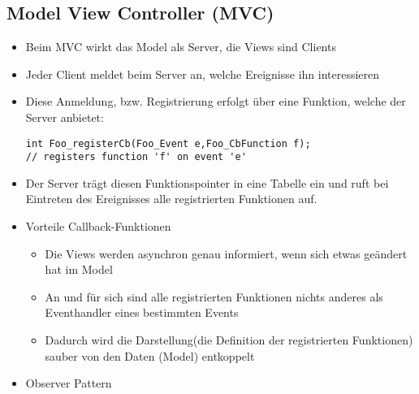 \subsection{Model View Controller (MVC) }
\begin{itemize}
	\item Beim MVC wirkt das Model als Server, die Views sind Clients
	\item Jeder Client meldet beim Server an, welche Ereignisse ihn interessieren
	\item Diese Anmeldung, bzw. Registrierung erfolgt über eine Funktion, welche der Server anbietet:
	\begin{lstlisting}[style=C]
int Foo_registerCb(Foo_Event e,Foo_CbFunction f);
// registers function 'f' on event 'e'
	\end{lstlisting}
	\item Der Server trägt diesen Funktionspointer in eine Tabelle ein und ruft bei Eintreten des Ereignisses alle registrierten Funktionen auf.
	\item Vorteile Callback-Funktionen
	\begin{itemize}
		\item Die Views werden asynchron genau informiert, wenn sich etwas geändert hat im Model
		\item An und für sich sind alle registrierten Funktionen nichts anderes als Eventhandler eines bestimmten Events
		\item Dadurch wird die Darstellung(die Definition der registrierten Funktionen) sauber von den Daten (Model) entkoppelt
	\end{itemize} 
	\item Observer Pattern
\end{itemize}
